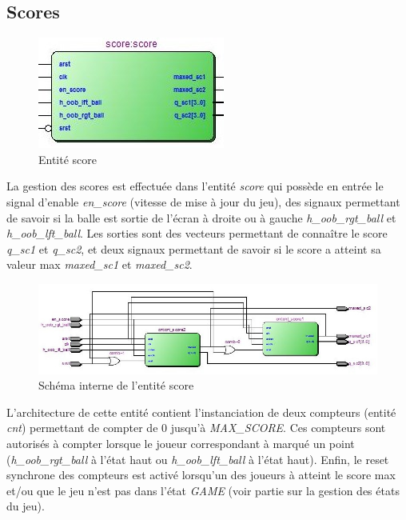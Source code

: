 \newpage
\subsection{Scores}
\begin{figure}[h!]
	\centering
	\includegraphics[scale=1.0]{images/score.jpg}
	\caption{Entité score}
	\label{fig:score}
\end{figure}

La gestion des scores est effectuée dans l'entité \emph{score} qui possède en entrée le signal d'enable \emph{en\_score} (vitesse de mise à jour du jeu), des signaux permettant de savoir si la balle est sortie de l'écran à droite ou à gauche \emph{h\_oob\_rgt\_ball} et \emph{h\_oob\_lft\_ball}. Les sorties sont des vecteurs permettant de connaître le score \emph{q\_sc1} et \emph{q\_sc2}, et deux signaux permettant de savoir si le score a atteint sa valeur max \emph{maxed\_sc1} et \emph{maxed\_sc2}.\\

\begin{figure}[h!]
	\centering
	\includegraphics[scale=0.75]{images/scorein.jpg}
	\caption{Schéma interne de l'entité score}
	\label{fig:scorein}
\end{figure}
L'architecture de cette entité contient l'instanciation de deux compteurs (entité \emph{cnt}) permettant de compter de 0 jusqu'à \emph{MAX\_SCORE}. Ces compteurs sont autorisés à compter lorsque le joueur correspondant à marqué un point (\emph{h\_oob\_rgt\_ball} à l'état haut ou \emph{h\_oob\_lft\_ball} à l'état haut). Enfin, le reset synchrone des compteurs est activé lorsqu'un des joueurs à atteint le score max et/ou que le jeu n'est pas dans l'état \emph{GAME} (voir partie sur la gestion des états du jeu).

\newpage
